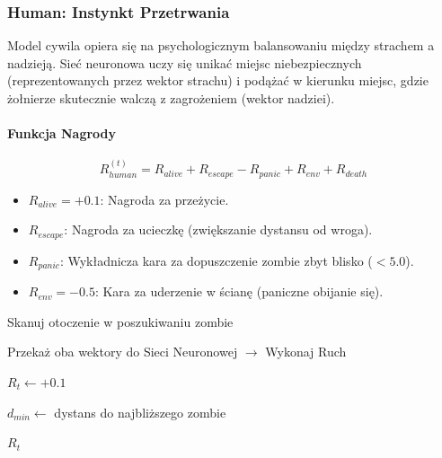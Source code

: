 \documentclass[12pt,a4paper]{article}
\begin{document}
\subsubsection{Human: Instynkt Przetrwania}

Model cywila opiera się na psychologicznym balansowaniu między strachem a
nadzieją. Sieć neuronowa uczy się unikać miejsc niebezpiecznych
(reprezentowanych przez wektor strachu) i podążać w kierunku miejsc, gdzie
żołnierze skutecznie walczą z zagrożeniem (wektor nadziei).

\paragraph{Funkcja Nagrody}
\begin{equation}
	R_{human}^{(t)} = R_{alive} + R_{escape} - R_{panic} + R_{env} + R_{death}
\end{equation}

\begin{itemize}
	\item $R_{alive} = +0.1$: Nagroda za przeżycie.
	\item $R_{escape}$: Nagroda za ucieczkę (zwiększanie dystansu od wroga).
	\item $R_{panic}$: Wykładnicza kara za dopuszczenie zombie zbyt blisko ($<5.0$).
	\item $R_{env} = -0.5$: Kara za uderzenie w ścianę (paniczne obijanie się).
\end{itemize}

\begin{algorithm}[H]
	\SetAlgoLined
	\caption{Algorytm Zachowania Człowieka}

	Skanuj otoczenie w poszukiwaniu zombie\;


	Przekaż oba wektory do Sieci Neuronowej $\rightarrow$ Wykonaj Ruch\;

	$R_t \leftarrow +0.1$ 


	$d_{min} \leftarrow$ dystans do najbliższego zombie\;

	\Return $R_t$\;
\end{algorithm}
\end{document}
